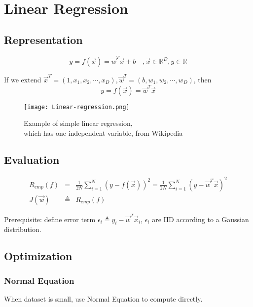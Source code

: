 \chapter{Linear Regression}


\section{Representation}

\begin{equation}
y=f(\vec{x})=\vec{w}^T\vec{x}+b \quad , \vec{x} \in \mathbb{R}^D, y \in \mathbb{R}
\end{equation}

If we extend $\vec{x}^T=(1,x_1,x_2,\cdots,x_D),\vec{w}^T=(b,w_1,w_2,\cdots,w_D)$, then
\begin{equation}
y=f(\vec{x})=\vec{w}^T\vec{x}
\end{equation}


\begin{figure}[hbtp]
\centering
    \texttt{[image: Linear-regression.png]}
\caption{Example of simple linear regression, \\ which has one independent variable, from Wikipedia}
\label{fig:Linear-regression} 
\end{figure}


\section{Evaluation}

\begin{eqnarray}
R_{emp}(f) &=& \frac{1}{2N}\sum\limits_{i=1}^N \left(y-f(\vec{x})\right)^2=\frac{1}{2N}\sum\limits_{i=1}^N \left(y-\vec{w}^T\vec{x}\right)^2 \\
J(\vec{w}) &\triangleq& R_{emp}(f)
\end{eqnarray}

Prerequisite: define error term $\epsilon_i \triangleq y_i-\vec{w}^T\vec{x}_i$, $\epsilon_i$ are IID according to a Gaussian distribution. 


\section{Optimization}


\subsection{Normal Equation}
When dataset is small, use Normal Equation to compute  directly.

